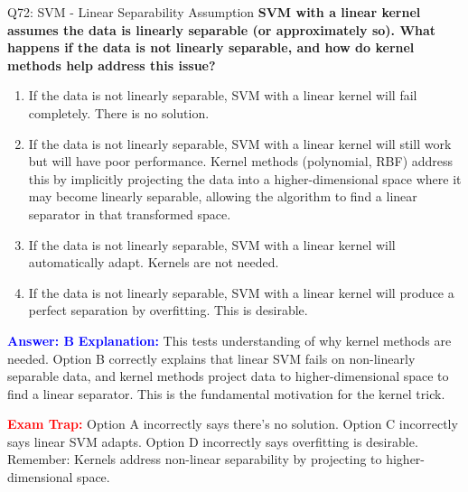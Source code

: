 \documentclass[8pt]{beamer}
\begin{document}
	\begin{frame}{Q72: SVM - Linear Separability Assumption}
		\fontsize{6.5}{7.5}\selectfont
		\textbf{SVM with a linear kernel assumes the data is linearly separable (or approximately so). What happens if the data is not linearly separable, and how do kernel methods help address this issue?}
		
		\begin{enumerate}
			\item If the data is not linearly separable, SVM with a linear kernel will fail completely. There is no solution.
			\item If the data is not linearly separable, SVM with a linear kernel will still work but will have poor performance. Kernel methods (polynomial, RBF) address this by implicitly projecting the data into a higher-dimensional space where it may become linearly separable, allowing the algorithm to find a linear separator in that transformed space.
			\item If the data is not linearly separable, SVM with a linear kernel will automatically adapt. Kernels are not needed.
			\item If the data is not linearly separable, SVM with a linear kernel will produce a perfect separation by overfitting. This is desirable.
		\end{enumerate}
		
		\vspace{0.1cm}
		\textcolor{blue}{\textbf{Answer: B}}
		\vspace{0.1cm}
		\textcolor{blue}{\textbf{Explanation:}} This tests understanding of why kernel methods are needed. Option B correctly explains that linear SVM fails on non-linearly separable data, and kernel methods project data to higher-dimensional space to find a linear separator. This is the fundamental motivation for the kernel trick.
		
		\textcolor{red}{\textbf{Exam Trap:}} Option A incorrectly says there's no solution. Option C incorrectly says linear SVM adapts. Option D incorrectly says overfitting is desirable. Remember: Kernels address non-linear separability by projecting to higher-dimensional space.
	\end{frame}
	
\end{document}
